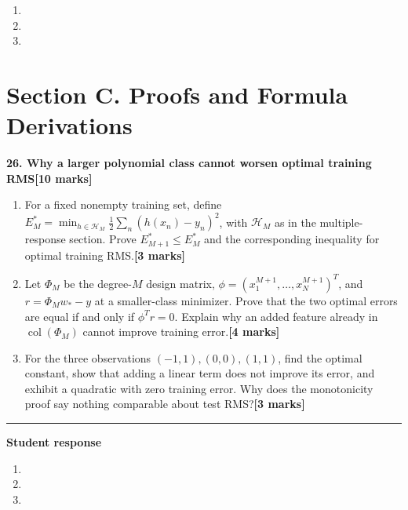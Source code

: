 \documentclass[11pt,a4paper]{article}
\newlength{\BlankAnswerHeight}\setlength{\BlankAnswerHeight}{16mm}
\newcommand{\AnswerBlank}{\leavevmode\par\vspace{\BlankAnswerHeight}}
\begin{document}
\begin{enumerate}[label=(\alph*),leftmargin=8mm,itemsep=3pt]
\item
\AnswerBlank
\item
\AnswerBlank
\item
\AnswerBlank
\end{enumerate}
\newpage\section*{Section C. Proofs and Formula Derivations}
\textbf{26. Why a larger polynomial class cannot worsen optimal training RMS}\hfill\textbf{[10 marks]}\par\medskip
\begin{enumerate}[label=(\alph*),leftmargin=8mm,itemsep=3pt]
\item For a fixed nonempty training set, define \(E_M^*=\min_{h\in\mathcal H_M}\tfrac12\sum_n(h(x_n)-y_n)^2\), with \(\mathcal H_M\) as in the multiple-response section. Prove \(E_{M+1}^*\leq E_M^*\) and the corresponding inequality for optimal training RMS.\hfill\textbf{[3 marks]}
\item Let \(\Phi_M\) be the degree-\(M\) design matrix, \(\phi=(x_1^{M+1},\ldots,x_N^{M+1})^T\), and \(r=\Phi_M w_*-y\) at a smaller-class minimizer. Prove that the two optimal errors are equal if and only if \(\phi^Tr=0\). Explain why an added feature already in \(\operatorname{col}(\Phi_M)\) cannot improve training error.\hfill\textbf{[4 marks]}
\item For the three observations \((-1,1),(0,0),(1,1)\), find the optimal constant, show that adding a linear term does not improve its error, and exhibit a quadratic with zero training error. Why does the monotonicity proof say nothing comparable about test RMS?\hfill\textbf{[3 marks]}
\end{enumerate}\par\medskip\hrule\medskip\textbf{Student response}\par
\begin{enumerate}[label=(\alph*),leftmargin=8mm,itemsep=3pt]
\item
\AnswerBlank
\item
\AnswerBlank
\item
\AnswerBlank
\end{enumerate}
\end{document}
